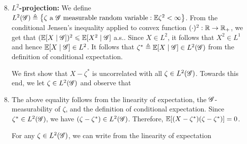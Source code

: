 \documentclass[12pt,aspectratio=169]{beamer}
\begin{document}
\begin{frame}
\begin{Proof}
\begin{enumerate}
\setcounter{enumi}{7}
\item \textbf{$L^2$-projection:} 
We define $L^2(\sG) \triangleq \set{\zeta \text{ a } \sG \text{ measurable random variable}: 
\E\zeta^2 < \infty%
}$. 
From the conditional Jensen's inequality applied to convex function $(\cdot)^2:\mathbb{R} \to \mathbb{R}_+$, 
we get that $(\mathbb{E}[X\mid\mathscr{G}])^2 \leqslant \mathbb{E}[X^2\mid\mathscr{G}]$ a.s.. 
Since $X\in L^2$, it follows that $X^2\in L^1$ and hence $\mathbb{E}[X\mid\mathscr{G}] \in L^2$. 
It follows that $\zeta^\ast \triangleq \mathbb{E}[X\mid\mathscr{G}] \in L^2(\mathscr{G})$ from the definition of conditional expectation. 
 
We first show that $X - \zeta^\ast$ is uncorrelated with all $\zeta \in L^2(\mathscr{G})$. 
Towards this end, we let $\zeta\in L^2(\mathscr{G})$ and observe that 
\end{enumerate}
\end{Proof}
\end{frame}

\begin{frame}
\begin{Proof}
\begin{enumerate}
\setcounter{enumi}{7}
\item {}
The above equality follows from the linearity of expectation, 
the $\mathscr{G}$-measurability of $\zeta$,  
and the definition of conditional expectation. 
Since $\zeta^\ast\in L^2(\mathscr{G})$, we have $(\zeta-\zeta^\ast)\in L^2(\mathscr{G})$. 
Therefore, $\mathbb{E}[(X - \zeta^\ast)(\zeta-\zeta^\ast)] = 0$.  
 
For any $\zeta\in L^2(\mathscr{G})$, 
we can write from the linearity of expectation 
\end{enumerate}
\end{Proof}
\end{frame}
\end{document}
